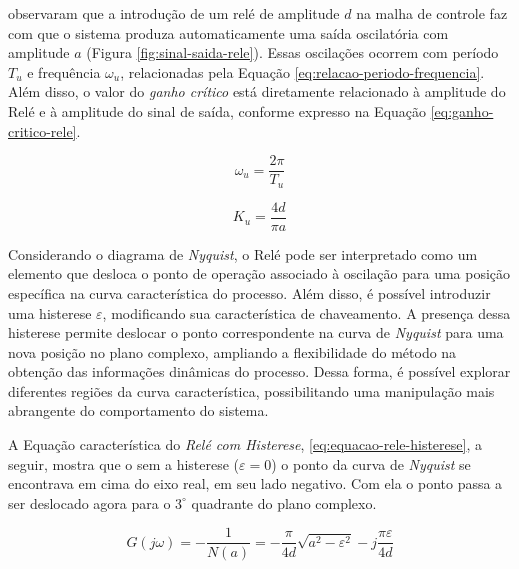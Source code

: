 			 observaram que a introdução de um relé de amplitude $d$ na malha de controle faz com que o sistema produza automaticamente uma saída oscilatória com amplitude $a$ (Figura \ref{fig:sinal-saida-rele}). Essas oscilações ocorrem com período $T_u$ e frequência $\omega_u$, relacionadas pela Equação \ref{eq:relacao-periodo-frequencia}. Além disso, o valor do \textit{ganho crítico} está diretamente relacionado à amplitude do Relé e à amplitude do sinal de saída, conforme expresso na Equação \ref{eq:ganho-critico-rele}.


			\begin{equation}
				\label{eq:relacao-periodo-frequencia}
				\omega_u = \frac{2 \pi}{T_u}
			\end{equation}

			\begin{equation}
				\label{eq:ganho-critico-rele}
				K_u = \frac{4 d}{\pi a}
			\end{equation}


			Considerando o diagrama de \textit{Nyquist}, o Relé pode ser interpretado como um elemento que desloca o ponto de operação associado à oscilação para uma posição específica na curva característica do processo. Além disso, é possível introduzir uma histerese $\varepsilon$, modificando sua característica de chaveamento. A presença dessa histerese permite deslocar o ponto correspondente na curva de \textit{Nyquist} para uma nova posição no plano complexo, ampliando a flexibilidade do método na obtenção das informações dinâmicas do processo. Dessa forma, é possível explorar diferentes regiões da curva característica, possibilitando uma manipulação mais abrangente do comportamento do sistema. 
			
			A Equação característica do \textit{Relé com Histerese}, \ref{eq:equacao-rele-histerese}, a seguir, mostra que o sem a histerese ($\varepsilon = 0$) o ponto da curva de \textit{Nyquist} se encontrava em cima do eixo real, em seu lado negativo. Com ela o ponto passa a ser deslocado agora para o $3^\circ$ quadrante do plano complexo.

			\begin{equation}
				\label{eq:equacao-rele-histerese}
				G(j \omega) = -\frac{1}{N(a)} = -\frac{\pi}{4d} \sqrt{a^2 - \varepsilon^2} - j \frac{\pi \varepsilon}{4d}
			\end{equation}


